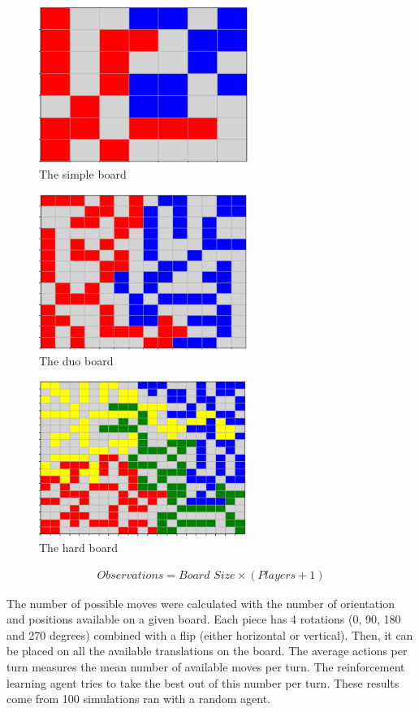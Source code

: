 \documentclass{article}
\begin{document}
\begin{figure}[h!]
\centering
\includegraphics[height=2in]{simple_game.png}
\caption{The simple board}
  \label{fig:simpleBoard}
\end{figure}

\begin{figure}[h!]
\centering
\includegraphics[height=2in]{duo_game.png}
  \caption{The duo board}
  \label{fig:duoBoard}
\end{figure}

\begin{figure}[h!]
\centering
\includegraphics[height=2in]{hard_game.png}
  \caption{The hard board}
  \label{fig:hardBoard}
\end{figure}

\begin{align}
\textit{Observations} = \textit{Board Size} \times (\textit{Players} + 1)
\label{formula:observation}
\end{align}

The number of possible moves were calculated with the number of orientation and positions available on a given board. Each piece has 4 rotations (0, 90, 180 and 270 degrees) combined with a flip (either horizontal or vertical). Then, it can be placed on all the available translations on the board. The average actions per turn measures the mean number of available moves per turn. The reinforcement learning agent tries to take the best out of this number per turn. These results come from 100 simulations ran with a random agent.
 
\end{document}
